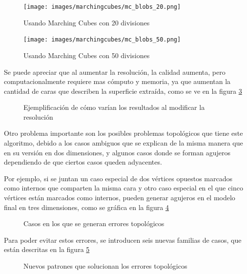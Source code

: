 \begin{figure}[hbp]
\centering
	\texttt{[image: images/marchingcubes/mc\_blobs\_20.png]}
\caption{Usando Marching Cubes con 20 divisiones}
\label{f:estadoDelArte:mc_blobs_20}
\end{figure}

\begin{figure}[hbp]
\centering
	\texttt{[image: images/marchingcubes/mc\_blobs\_50.png]}
\caption{Usando Marching Cubes con 50 divisiones}
\label{f:estadoDelArte:mc_blobs_50}
\end{figure}

Se puede apreciar que al aumentar la resolución, la calidad aumenta, pero 
computacionalmente requiere mas cómputo y memoria, ya que aumentan la cantidad de caras que 
describen la superficie extraída, como se ve en la figura \ref{f:estadoDelArte:polygonise3}

\begin{figure}[hbp]
\centering
\caption{Ejemplificación de cómo varían los resultados al modificar la resolución}
\label{f:estadoDelArte:polygonise3}
\end{figure}

Otro problema importante son los posibles problemas topológicos que tiene este 
algoritmo, debido a los casos ambiguos que se explican de la misma manera que en su versión en 
dos dimensiones, y algunos casos donde se forman agujeros dependiendo de que ciertos casos 
queden adyacentes.

Por ejemplo, si se juntan un caso especial de dos vértices opuestos marcados como 
internos que comparten la misma cara y otro caso especial en el que cinco vértices están 
marcados como internos, pueden generar agujeros en el modelo final en tres dimensiones, como 
se gráfica en la figura \ref{f:estadoDelArte:MCAmbEx}

\begin{figure}[hbp]
\centering
\caption{Casos en los que se generan errores topológicos}
\label{f:estadoDelArte:MCAmbEx}
\end{figure}

Para poder evitar estos errores, se introducen seis nuevas familias de casos, que están descritas en
la figura \ref{f:estadoDelArte:MCAmb}

\begin{figure}[hbp]
\centering
\caption{Nuevos patrones que solucionan los errores topológicos}
\label{f:estadoDelArte:MCAmb}
\end{figure}

